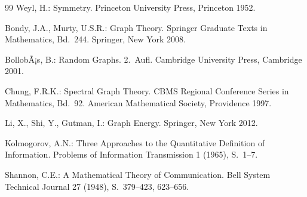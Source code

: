 ﻿\documentclass[a4paper,12pt]{article}
\theoremstyle{definition}
\begin{document}
\begin{thebibliography}{99}
Weyl, H.:
Symmetry.
Princeton University Press, Princeton 1952.


Bondy, J.A., Murty, U.S.R.:
Graph Theory. Springer Graduate Texts in Mathematics, Bd.~244.
Springer, New York 2008.

BollobÃ¡s, B.:
Random Graphs. 2.~Aufl.
Cambridge University Press, Cambridge 2001.

Chung, F.R.K.:
Spectral Graph Theory. CBMS Regional Conference Series in Mathematics, Bd.~92.
American Mathematical Society, Providence 1997.

Li, X., Shi, Y., Gutman, I.:
Graph Energy.
Springer, New York 2012.

Kolmogorov, A.N.:
Three Approaches to the Quantitative Definition of Information.
Problems of Information Transmission 1 (1965), S.~1--7.

Shannon, C.E.:
A Mathematical Theory of Communication.
Bell System Technical Journal 27 (1948), S.~379--423, 623--656.

\end{thebibliography}
\end{document}
